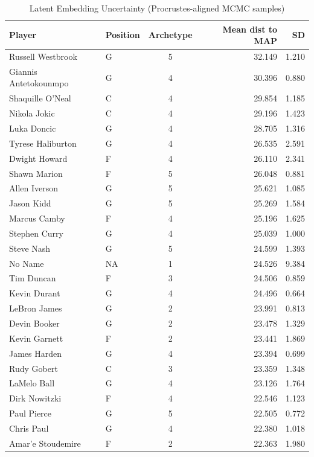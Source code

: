\begin{table}[t]
\caption*{
{\fontsize{20}{25}\selectfont  Latent Embedding Uncertainty (Procrustes-aligned MCMC samples)\fontsize{12}{15}\selectfont }
} 
\fontsize{12.0pt}{14.0pt}\selectfont
\begin{tabular*}{\linewidth}{@{\extracolsep{\fill}}llcrr}
\toprule
Player & Position & Archetype & Mean dist to MAP & SD \\ 
\midrule\addlinespace[2.5pt]
Russell Westbrook & G & 5 & 32.149 & 1.210 \\ 
Giannis Antetokounmpo & G & 4 & 30.396 & 0.880 \\ 
Shaquille O'Neal & C & 4 & 29.854 & 1.185 \\ 
Nikola Jokic & C & 4 & 29.196 & 1.423 \\ 
Luka Doncic & G & 4 & 28.705 & 1.316 \\ 
Tyrese Haliburton & G & 4 & 26.535 & 2.591 \\ 
Dwight Howard & F & 4 & 26.110 & 2.341 \\ 
Shawn Marion & F & 5 & 26.048 & 0.881 \\ 
Allen Iverson & G & 5 & 25.621 & 1.085 \\ 
Jason Kidd & G & 5 & 25.269 & 1.584 \\ 
Marcus Camby & F & 4 & 25.196 & 1.625 \\ 
Stephen Curry & G & 4 & 25.039 & 1.000 \\ 
Steve Nash & G & 5 & 24.599 & 1.393 \\ 
No Name & NA & 1 & 24.526 & 9.384 \\ 
Tim Duncan & F & 3 & 24.506 & 0.859 \\ 
Kevin Durant & G & 4 & 24.496 & 0.664 \\ 
LeBron James & G & 2 & 23.991 & 0.813 \\ 
Devin Booker & G & 2 & 23.478 & 1.329 \\ 
Kevin Garnett & F & 2 & 23.441 & 1.869 \\ 
James Harden & G & 4 & 23.394 & 0.699 \\ 
Rudy Gobert & C & 3 & 23.359 & 1.348 \\ 
LaMelo Ball & G & 4 & 23.126 & 1.764 \\ 
Dirk Nowitzki & F & 4 & 22.546 & 1.123 \\ 
Paul Pierce & G & 5 & 22.505 & 0.772 \\ 
Chris Paul & G & 4 & 22.380 & 1.018 \\ 
Amar'e Stoudemire & F & 2 & 22.363 & 1.980 \\ 

\end{tabular*}
\end{table}
